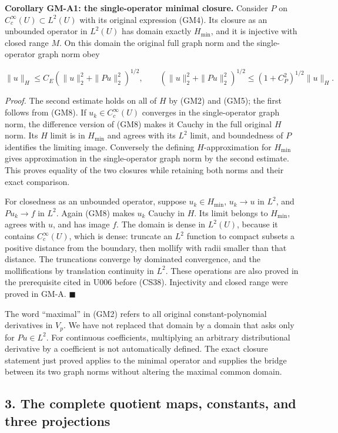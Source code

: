 \documentclass[
  11pt,
]{article}
\begin{document}
\textbf{Corollary GM-A1: the single-operator minimal closure.} Consider
\(P\) on \(C_c^\infty(U)\subset L^2(U)\) with its
original expression (GM4). Its closure as an unbounded operator in
\(L^2(U)\) has domain exactly
\(H_{\min}\), and it is injective with closed range
\(M\). On this domain the original full graph norm
and the single-operator graph norm obey

\[
 \|u\|_H\leq C_E\left(\|u\|_2^2+\|Pu\|_2^2\right)^{1/2},
 \qquad
 \left(\|u\|_2^2+\|Pu\|_2^2\right)^{1/2}
       \leq (1+C_P^2)^{1/2}\|u\|_H.
 \tag{GM13}
\]

\emph{Proof.} The second estimate holds on all of
\(H\) by (GM2) and (GM5); the first follows from
(GM8). If \(u_k\in C_c^\infty(U)\) converges in the single-operator
graph norm, the difference version of (GM8) makes it Cauchy in the full
original \(H\) norm. Its \(H\)
limit is in \(H_{\min}\) and agrees with its
\(L^2\) limit, and boundedness of
\(P\) identifies the limiting image. Conversely the
defining \(H\)-approximation for
\(H_{\min}\) gives approximation in the single-operator
graph norm by the second estimate. This proves equality of the two
closures while retaining both norms and their exact comparison.

For closedness as an unbounded operator, suppose
\(u_k\in H_{\min}\), \(u_k\to u\) in
\(L^2\), and \(Pu_k\to f\) in
\(L^2\). Again (GM8) makes \(u_k\)
Cauchy in \(H\). Its limit belongs to
\(H_{\min}\), agrees with \(u\), and
has image \(f\). The domain is dense in
\(L^2(U)\), because it contains
\(C_c^\infty(U)\), which is dense: truncate an
\(L^2\) function to compact subsets a positive
distance from the boundary, then mollify with radii smaller than that
distance. The truncations converge by dominated convergence, and the
mollifications by translation continuity in \(L^2\).
These operations are also proved in the prerequisite cited in U006
before (CS38). Injectivity and closed range were proved in GM-A.
\hfill\ensuremath{\blacksquare}

The word ``maximal'' in (GM2) refers to all original constant-polynomial
derivatives in \(V_p\). We have not replaced that
domain by a domain that asks only for \(Pu\in L^2\). For
continuous coefficients, multiplying an arbitrary distributional
derivative by a coefficient is not automatically defined. The exact
closure statement just proved applies to the minimal operator and
supplies the bridge between its two graph norms without altering the
maximal common domain.

\subsection{3. The complete quotient maps, constants, and three
projections}\label{the-complete-quotient-maps-constants-and-three-projections}
\end{document}
